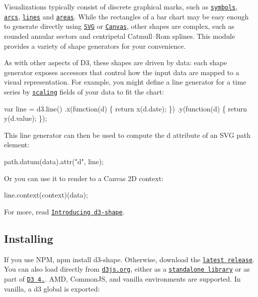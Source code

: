 Visualizations typically consist of discrete graphical marks, such as \href{#symbols}{\tt symbols}, \href{#arcs}{\tt arcs}, \href{#lines}{\tt lines} and \href{#areas}{\tt areas}. While the rectangles of a bar chart may be easy enough to generate directly using \href{http://www.w3.org/TR/SVG/paths.html#PathData}{\tt S\+VG} or \href{http://www.w3.org/TR/2dcontext/#canvaspathmethods}{\tt Canvas}, other shapes are complex, such as rounded annular sectors and centripetal Catmull–\+Rom splines. This module provides a variety of shape generators for your convenience.

As with other aspects of D3, these shapes are driven by data\+: each shape generator exposes accessors that control how the input data are mapped to a visual representation. For example, you might define a line generator for a time series by \href{https://github.com/d3/d3-scale}{\tt scaling} fields of your data to fit the chart\+:


\begin{DoxyCode}
var line = d3.line()
    .x(function(d) \{ return x(d.date); \})
    .y(function(d) \{ return y(d.value); \});
\end{DoxyCode}


This line generator can then be used to compute the {\ttfamily d} attribute of an S\+VG path element\+:


\begin{DoxyCode}
path.datum(data).attr("d", line);
\end{DoxyCode}


Or you can use it to render to a Canvas 2D context\+:


\begin{DoxyCode}
line.context(context)(data);
\end{DoxyCode}


For more, read \href{https://medium.com/@mbostock/introducing-d3-shape-73f8367e6d12}{\tt Introducing d3-\/shape}.

\subsection*{Installing}

If you use N\+PM, {\ttfamily npm install d3-\/shape}. Otherwise, download the \href{https://github.com/d3/d3-shape/releases/latest}{\tt latest release}. You can also load directly from \href{https://d3js.org}{\tt d3js.\+org}, either as a \href{https://d3js.org/d3-shape.v1.min.js}{\tt standalone library} or as part of \href{https://github.com/d3/d3}{\tt D3 4.}. A\+MD, Common\+JS, and vanilla environments are supported. In vanilla, a {\ttfamily d3} global is exported\+:



